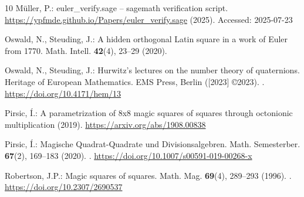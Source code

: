 \documentclass[12pt]{amsart}
\theoremstyle{definition}
\begin{document}
\begin{thebibliography}{10}
M{\"u}ller, P.: euler\_verify.sage -- sagemath verification script.
\newblock \url{https://ypfmde.github.io/Papers/euler_verify.sage} (2025).
\newblock Accessed: 2025-07-23

Oswald, N., Steuding, J.: A hidden orthogonal {Latin} square in a work of
  {Euler} from 1770.
\newblock Math. Intell. \textbf{42}(4), 23--29 (2020).
\newblock {}

Oswald, N., Steuding, J.: Hurwitz's lectures on the number theory of
  quaternions.
\newblock Heritage of European Mathematics. EMS Press, Berlin ([2023]
  \copyright 2023).
\newblock {}.
\newblock \urlprefix\url{https://doi.org/10.4171/hem/13}

Pirsic, Í.: A parametrization of 8x8 magic squares of squares through
  octonionic multiplication (2019).
\newblock \urlprefix\url{https://arxiv.org/abs/1908.00838}

Pirsic, Í.: Magische {Q}uadrat-{Q}uadrate und {D}ivisionsalgebren.
\newblock Math. Semesterber. \textbf{67}(2), 169--183 (2020).
\newblock {}.
\newblock \urlprefix\url{https://doi.org/10.1007/s00591-019-00268-x}

Robertson, J.P.: Magic squares of squares.
\newblock Math. Mag. \textbf{69}(4), 289--293 (1996).
\newblock {}.
\newblock \urlprefix\url{https://doi.org/10.2307/2690537}

\end{thebibliography}
\end{document}
